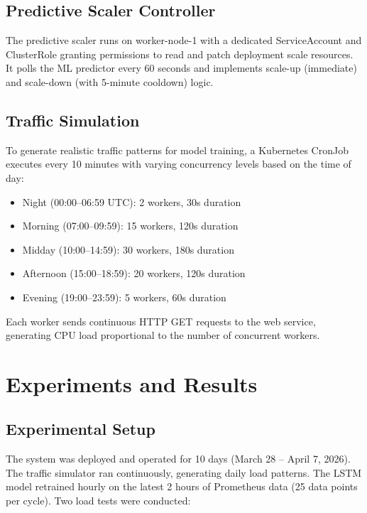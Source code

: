 \documentclass[journal]{IEEEtran}
\begin{document}
\subsection{Predictive Scaler Controller}
The predictive scaler runs on worker-node-1 with a dedicated ServiceAccount and ClusterRole granting permissions to read and patch deployment scale resources. It polls the ML predictor every 60 seconds and implements scale-up (immediate) and scale-down (with 5-minute cooldown) logic.

\subsection{Traffic Simulation}
To generate realistic traffic patterns for model training, a Kubernetes CronJob executes every 10 minutes with varying concurrency levels based on the time of day:

\begin{itemize}
    \item Night (00:00--06:59 UTC): 2 workers, 30s duration
    \item Morning (07:00--09:59): 15 workers, 120s duration
    \item Midday (10:00--14:59): 30 workers, 180s duration
    \item Afternoon (15:00--18:59): 20 workers, 120s duration
    \item Evening (19:00--23:59): 5 workers, 60s duration
\end{itemize}

Each worker sends continuous HTTP GET requests to the web service, generating CPU load proportional to the number of concurrent workers.

\section{Experiments and Results}
\label{sec:experiments}

\subsection{Experimental Setup}
The system was deployed and operated for 10 days (March 28 -- April 7, 2026). The traffic simulator ran continuously, generating daily load patterns. The LSTM model retrained hourly on the latest 2 hours of Prometheus data (25 data points per cycle). Two load tests were conducted:
\end{document}
